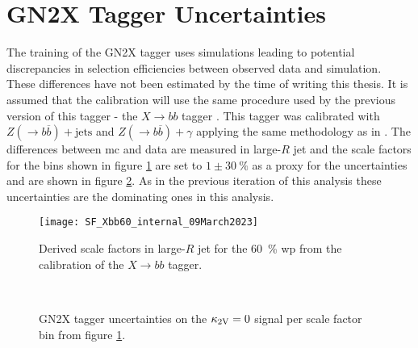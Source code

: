\section{GN2X Tagger Uncertainties}
The training of the GN2X tagger uses simulations leading to potential discrepancies in selection efficiencies between observed data and simulation. These differences have not been estimated by the time of writing this thesis. It is assumed that the calibration will use the same procedure used by the previous version of this tagger - the $X\rightarrow bb$ tagger \citep{ATL-PHYS-PUB-2020-019}. This tagger was calibrated with $Z(\rightarrow b\overline{b})+\text{jets}$ and $Z(\rightarrow b\overline{b})+\gamma$ applying the same methodology as in \citep{ATL-PHYS-PUB-2021-035}. The differences between \ac{mc} and data are measured in large-$R$ jet \pt and the scale factors for the bins shown in figure \ref{fig:xbb_sf} are set to  $1\pm\qty[]{30}{\percent}$ as a proxy for the uncertainties and are shown in figure \ref{fig:xbb_uncertainties}. As in the previous iteration of this analysis these uncertainties are the dominating ones in this analysis.
\begin{figure}
    \centering
    \texttt{[image: SF\_Xbb60\_internal\_09March2023]}
    \caption[]{Derived scale factors in large-$R$ jet \pt for the  \qty[]{60}{\percent} \ac{wp} from the calibration of the $X\rightarrow bb$ tagger.}
    \label{fig:xbb_sf}
\end{figure}

\begin{figure}
    \centering
    \\
    \caption[]{GN2X tagger uncertainties on the $\kappa_{\text{2V}}=0$ signal per scale factor bin from figure \ref{fig:xbb_sf}.}
    \label{fig:xbb_uncertainties}
\end{figure}



